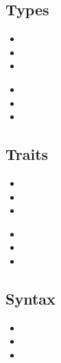 \documentclass[xcolor={svgnames},hyperref]{beamer}
\begin{document}
\subsection{Types}

    \begin{frame}
        \begin{itemize}
            \item
            \item
            \item
        \end{itemize}
    \end{frame}


    \begin{frame}
        \begin{itemize}
            \item
            \item
            \item
        \end{itemize}
    \end{frame}

\subsection{Traits}
    \begin{frame}
        \begin{itemize}
            \item
            \item
            \item
        \end{itemize}
    \end{frame}


    \begin{frame}
        \begin{itemize}
            \item
            \item
            \item
        \end{itemize}
    \end{frame}

\subsection{Syntax}

    \begin{frame}
        \begin{itemize}
            \item
            \item
            \item
        \end{itemize}
    \end{frame}
\end{document}
